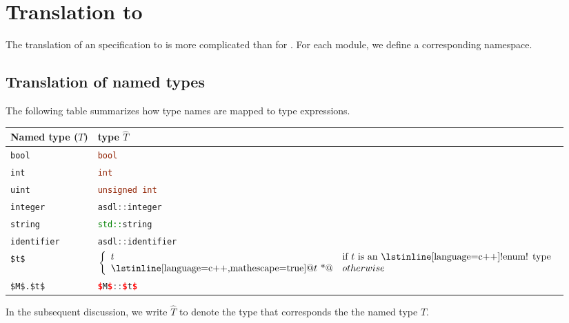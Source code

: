 \section{Translation to \Cplusplus{}}

The translation of an \asdl{} specification to \Cplusplus{} is more complicated than for \sml{}.
For each \asdl{} module, we define a corresponding \Cplusplus{} namespace.

\subsection{Translation of named types}

The following table summarizes how type names are mapped to \Cplusplus{} type expressions.
%
\begin{center}
  \begin{tabular}{|p{2in}|p{3in}|}
    \hline
      \textbf{Named \asdl{} type ($T$)} &  \textbf{\Cplusplus{} type $\widehat{T}$} \\
    \hline
      \lstinline!bool! & \lstinline[language=c++]!bool! \\[0.5em]
      \lstinline!int! & \lstinline[language=c++]!int! \\[0.5em]
      \lstinline!uint! & \lstinline[language=c++]!unsigned int! \\[0.5em]
      \lstinline!integer! & \lstinline[language=c++]!asdl::integer! \\[0.5em]
      \lstinline!string! & \lstinline[language=c++]!std::string! \\[0.5em]
      \lstinline!identifier! & \lstinline[language=c++]!asdl::identifier! \\[0.5em]
      \lstinline[language=ASDL,mathescape=true]@$t$@ &
        $\left\{
        \begin{array}{ll}
          t & \text{if $t$ is an \lstinline[language=c++]!enum! type} \\
          \text{\lstinline[language=c++,mathescape=true]@$t$ *@} & otherwise \\
        \end{array}
        \right.$ \\[0.5em]
      \lstinline[language=ASDL,mathescape=true]@$M$.$t$@ & \lstinline[language=c++,mathescape=true]@$M$::$t$@ \\[0.5em]
    \hline
  \end{tabular}%
\end{center}%
%
In the subsequent discussion, we write $\widehat{T}$ to denote the \Cplusplus{} type
that corresponds the the \asdl{} named type $T$.

